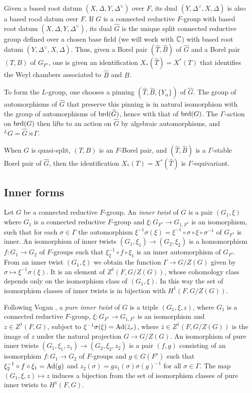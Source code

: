 \documentclass{article}
\theoremstyle{definition}
\numberwithin{equation}{section}
\renewcommand{\-}{\hyp{}}
\begin{document}
Given a based root datum $(X,\Delta,Y,\Delta^\vee)$ over $F$, its dual $(Y,\Delta^\vee,X,\Delta)$ is also a based rood datum over $F$. If $G$ is a connected reductive $F$-group with based root datum $(X,\Delta,Y,\Delta^\vee)$, its dual $\hat G$ is the unique split connected reductive group defined over a chosen base field (we will work with $\mathbb{C}$) with based root datum $(Y,\Delta^\vee,X,\Delta)$. Thus, given a Borel pair $(\hat T,\hat B)$ of $\hat G$ and a Borel pair $(T,B)$ of $G_{F^s}$, one is given an identification $X_*(\hat T)=X^*(T)$ that identifies the Weyl chambers associated to $\hat B$ and $B$.

To form the $L$\-group, one chooses a pinning $(\hat T,\hat B,\{Y_\alpha\})$ of $\hat G$. The group of automorphisms of $\hat G$ that preserve this pinning is in natural isomorphism with the group of automorphisms of $\textrm{brd}(\widehat G)$, hence with that of $\textrm{brd}(G)$. The $\Gamma$-action on $\textrm{brd}(G)$ then lifts to an action on $\hat G$ by algebraic automorphisms, and $^LG=\hat G \rtimes \Gamma$.

When $G$ is quasi-split, $(T,B)$ is an $F$-Borel pair, and $(\hat T,\hat B)$ is a $\Gamma$-stable Borel pair of $\hat G$, then the identification $X_*(T)=X^*(\hat T)$ is $\Gamma$-equivariant.

\subsection{Inner forms}
\label{s:inner}

Let $G$ be a connected reductive $F$-group. An \emph{inner twist} of $G$ is a pair $(G_1,\xi)$ where $G_1$ is a connected reductive $F$-group and $\xi : G_{F^s} \to G_{1,F^s}$ is an isomorphism, such that for each $\sigma \in \Gamma$ the automorphism $\xi^{-1}\sigma(\xi) = \xi^{-1}\circ\sigma\circ\xi\circ\sigma^{-1}$ of $G_{F^s}$ is inner. An isomorphism of inner twists $(G_1,\xi_1) \to (G_2,\xi_2)$ is a homomorphism $f : G_1 \to G_2$ of $F$-groups such that $\xi_2^{-1}\circ f \circ \xi_1$ is an inner automorphism of $G_{F^s}$. From an inner twist $(G_1,\xi)$ we obtain the function $\Gamma \to G/Z(G)$ given by $\sigma \mapsto \xi^{-1}\sigma(\xi)$. It is an element of $Z^1(F,G/Z(G))$, whose cohomology class depends only on the isomorphism class of $(G_1,\xi)$. In this way the set of isomorphism classes of inner twists is in bijection with $H^1(F,G/Z(G))$.



Following Vogan \cite{Vog93}, a \emph{pure inner twist} of $G$ is a triple $(G_1,\xi,z)$, where $G_1$ is a connected reductive $F$-group, $\xi : G_{F^s} \to G_{1,F^s}$ is an isomorphism and $z \in Z^1(F,G)$, subject to $\xi^{-1}\sigma(\xi)=\textrm{Ad}(\bar z_\sigma)$, where $\bar z \in Z^1(F,G/Z(G))$ is the image of $z$ under the natural projection $G \to G/Z(G)$. An isomorphism of pure inner twists $(G_1,\xi_1,z_1) \to (G_2,\xi_2,z_2)$ is a pair $(f,g)$ consisting of an isomorphism $f : G_1 \to G_2$ of $F$-groups and $g \in G(F^s)$ such that $\xi_2^{-1}\circ f \circ \xi_1=\textrm{Ad}(g)$ and $z_2(\sigma)=gz_1(\sigma)\sigma(g)^{-1}$ for all $\sigma \in \Gamma$. The map $(G_1,\xi,z) \mapsto z$ induces a bijection from the set of isomorphism classes of pure inner twists to $H^1(F,G)$.
\end{document}
